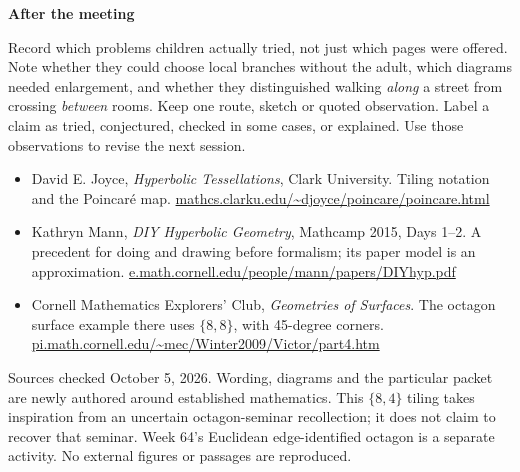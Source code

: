 \documentclass[11pt]{article}
\newcommand{\topic}[1]{\vspace{4pt}{\large\bfseries #1}\par}
\newcommand{\sub}[1]{{\bfseries #1}\par}
\begin{document}
\sub{After the meeting}
Record which problems children actually tried, not just which pages were offered. Note whether they could choose local branches without the adult, which diagrams needed enlargement, and whether they distinguished walking \emph{along} a street from crossing \emph{between} rooms. Keep one route, sketch or quoted observation. Label a claim as tried, conjectured, checked in some cases, or explained. Use those observations to revise the next session.

\topic{Sources and scope}
\begin{itemize}
\item David E. Joyce, \emph{Hyperbolic Tessellations}, Clark University. Tiling notation and the Poincar\'e map. \href{https://mathcs.clarku.edu/~djoyce/poincare/poincare.html}{mathcs.clarku.edu/\textasciitilde djoyce/poincare/poincare.html}
\item Kathryn Mann, \emph{DIY Hyperbolic Geometry}, Mathcamp 2015, Days 1--2. A precedent for doing and drawing before formalism; its paper model is an approximation. \href{https://e.math.cornell.edu/people/mann/papers/DIYhyp.pdf}{e.math.cornell.edu/people/mann/papers/DIYhyp.pdf}
\item Cornell Mathematics Explorers' Club, \emph{Geometries of Surfaces}. The octagon surface example there uses \(\{8,8\}\), with 45-degree corners. \href{https://pi.math.cornell.edu/~mec/Winter2009/Victor/part4.htm}{pi.math.cornell.edu/\textasciitilde mec/Winter2009/Victor/part4.htm}
\end{itemize}
Sources checked October 5, 2026. Wording, diagrams and the particular packet are newly authored around established mathematics. This \(\{8,4\}\) tiling takes inspiration from an uncertain octagon-seminar recollection; it does not claim to recover that seminar. Week 64's Euclidean edge-identified octagon is a separate activity. No external figures or passages are reproduced.
\end{document}
